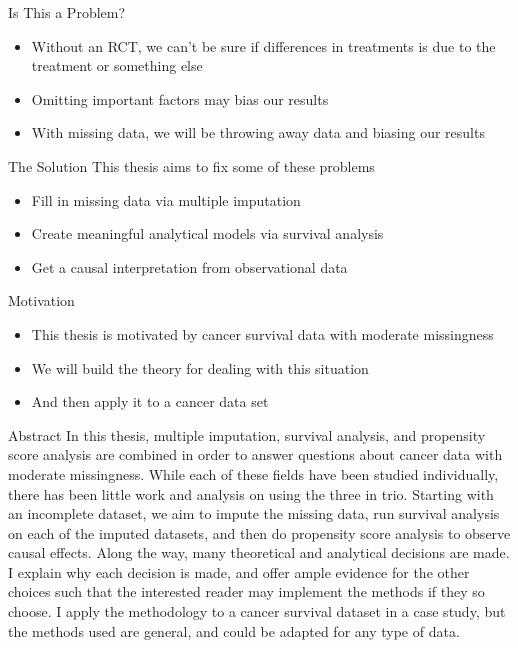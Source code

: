\begin{frame}{Is This a Problem?}

  \begin{itemize}
   \item Without an RCT, we can't be sure if differences in treatments is due to the treatment or something else
   \item Omitting important factors may bias our results
   \item With missing data, we will be throwing away data and biasing our results
  \end{itemize}


\end{frame}

\begin{frame}{The Solution}
This thesis aims to fix some of these problems
  \begin{itemize}
   \item Fill in missing data via multiple imputation
   \item Create meaningful analytical models via survival analysis
   \item Get a causal interpretation from observational data
  \end{itemize}


\end{frame}

\begin{frame}{Motivation}
\begin{itemize}
   \item This thesis is motivated by cancer survival data with moderate missingness
   \item We will build the theory for dealing with this situation
   \item And then apply it to a cancer data set
  \end{itemize}


\end{frame}

\begin{frame}{Abstract}
In this thesis, multiple imputation, survival analysis, and propensity score analysis are combined in 
order to answer questions about cancer data with moderate missingness. While each of these fields have 
been studied individually, there has been little work and analysis on using the three in trio.
Starting with an incomplete dataset, we aim to impute the missing data, run survival analysis on each
of the imputed datasets, and then do propensity score analysis to observe causal effects.
Along the way, many theoretical and analytical decisions are made. I explain why each decision is made, 
and offer ample evidence for the other choices such that the interested reader may implement the methods
if they so choose. I apply the methodology to a cancer survival dataset in a case study, but the methods 
used are general, and could be adapted for any type of data.
 
\end{frame}
